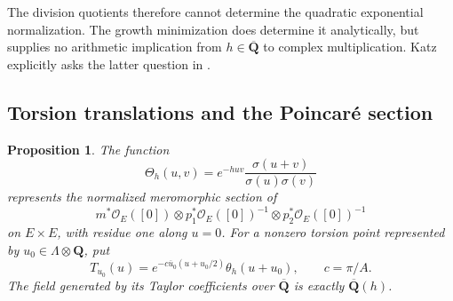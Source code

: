 \documentclass[11pt]{article}
\newtheorem{proposition}[theorem]{Proposition}
\theoremstyle{definition}\newtheorem{definition}[theorem]{Definition}
\theoremstyle{remark}\newtheorem{remark}[theorem]{Remark}
\newcommand{\Q}{\mathbf Q}\newcommand{\Z}{\mathbf Z}
\newcommand{\Qb}{\overline{\mathbf Q}}\newcommand{\Fp}{\mathbf F_p}
\begin{document}
The division quotients therefore cannot determine the quadratic exponential normalization. The growth minimization does determine it analytically, but supplies no arithmetic implication from $h\in\Qb$ to complex multiplication. Katz explicitly asks the latter question in \cite[Question 4.0.8, p.~501]{Katz}.

\subsection{Torsion translations and the Poincar\'e section}
\begin{proposition}\label{prop:theta-torsion}
The function
\[
 \Theta_h(u,v)=e^{-huv}\frac{\sigma(u+v)}{\sigma(u)\sigma(v)}
\]
represents the normalized meromorphic section of
\[
 m^*\mathcal O_E([0])\otimes p_1^*\mathcal O_E([0])^{-1}
                         \otimes p_2^*\mathcal O_E([0])^{-1}
\]
on $E\times E$, with residue one along $u=0$. For a nonzero torsion point represented by $u_0\in\Lambda\otimes\Q$, put
\[
 T_{u_0}(u)=e^{-c\overline u_0(u+u_0/2)}\theta_h(u+u_0),\qquad c=\pi/A.
\]
The field generated by its Taylor coefficients over $\Qb$ is exactly $\Qb(h)$.
\end{proposition}
\end{document}
